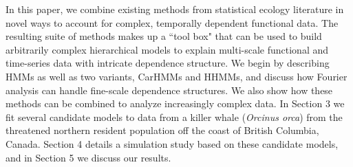 In this paper, we combine existing methods from statistical ecology literature in novel ways to account for complex, temporally dependent functional data. The resulting suite of methods makes up a ``tool box" that can be used to build arbitrarily complex hierarchical models to explain multi-scale functional and time-series data with intricate dependence structure.
We begin by describing HMMs as well as two variants, CarHMMs and HHMMs, and discuss how Fourier analysis can handle fine-scale dependence structures. We also show how these methods can be combined to analyze increasingly complex data. In Section 3 we fit several candidate models to data from a killer whale (\textit{Orcinus orca}) from the threatened northern resident population off the coast of British Columbia, Canada. Section 4 details a simulation study based on these candidate models, and in Section 5 we discuss our results.